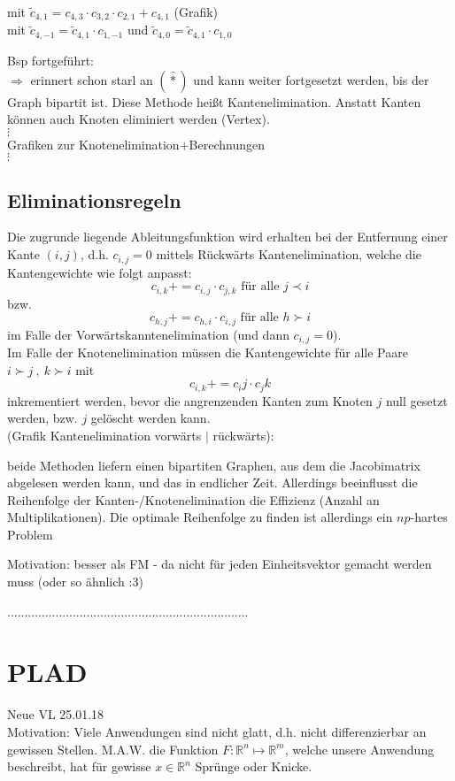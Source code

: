 \noindent
mit $\tilde{c}_{4,1}= c_{4,3}\cdot c_{3,2} \cdot c_{2,1} + c_{4,1}$
(Grafik)\\

\vspace{2cm}
mit $\tilde{c}_{4,-1} = \tilde{c}_{4,1}\cdot c_{1,-1}$ und $\tilde{c}_{4,0}=\tilde{c}_{4,1}\cdot c_{1,0}$

Bsp fortgeführt:\\
$\Rightarrow$ erinnert schon starl an $(\hat{*})$ und kann weiter fortgesetzt werden, bis der Graph bipartit ist. Diese Methode heißt Kantenelimination. Anstatt Kanten können auch Knoten eliminiert werden (Vertex).\\
$\vdots$\\
Grafiken zur Knotenelimination+Berechnungen\\
$\vdots$

\subsection{Eliminationsregeln}
Die zugrunde liegende Ableitungsfunktion wird erhalten bei der Entfernung einer Kante $(i,j)$, d.h. $c_{i,j}=0$ mittels Rückwärts Kantenelimination, welche die Kantengewichte wie folgt anpasst:
$$c_{i,k} += c_{i,j}\cdot c_{j,k} \text{ für alle } j\prec i$$
bzw.
$$c_{h,j} += c_{h,i}\cdot c_{i,j} \text{ für alle } h \succ i $$
im Falle der Vorwärtskanntenelimination (und dann $c_{i,j} =0$).\\
Im Falle der Knotenelimination müssen die Kantengewichte für alle Paare $i\succ j\ ,\ k\succ i$ mit 
$$ c_{i,k}+=c_ij\cdot c_jk$$
inkrementiert werden, bevor die angrenzenden Kanten zum Knoten $j$ null gesetzt werden, bzw. $j$ gelöscht werden kann.\\
(Grafik Kantenelimination vorwärts $|$ rückwärts):\\

\vspace{4cm}


beide Methoden liefern einen bipartiten Graphen, aus dem die Jacobimatrix abgelesen werden kann, und das in endlicher Zeit. Allerdings beeinflusst die Reihenfolge der Kanten-/Knotenelimination die Effizienz (Anzahl an Multiplikationen). Die optimale Reihenfolge zu finden ist allerdings ein $np$-hartes Problem

Motivation: besser als FM - da nicht für jeden Einheitsvektor gemacht werden muss (oder so ähnlich :3)


......................................................................
\section{PLAD}
Neue VL 25.01.18\\
Motivation: Viele Anwendungen sind nicht glatt, d.h. nicht differenzierbar an gewissen Stellen.
M.A.W. die Funktion $F:\mathbb{R}^n \mapsto \mathbb{R}^m$, welche unsere Anwendung beschreibt, hat für gewisse $x \in \mathbb{R}^n$ Sprünge oder Knicke.


